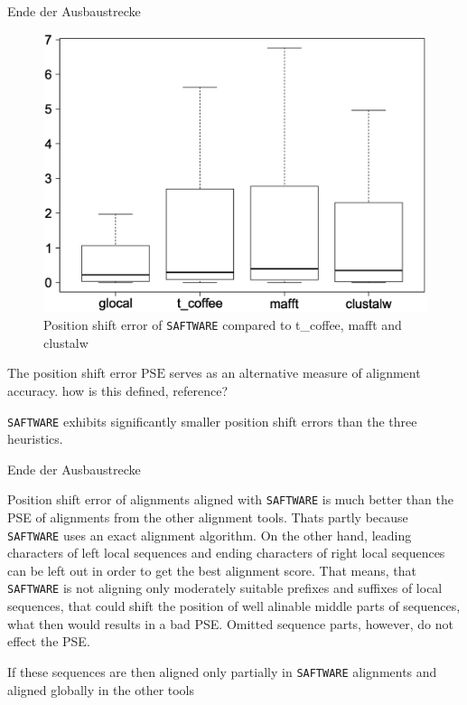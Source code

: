 \documentclass[a4paper,10pt]{article}
\newcommand{\TODO}[1]{\begingroup\color{red}#1\endgroup}
\newcommand{\NR}[1]{\begingroup\color{orange}#1\endgroup}
\newcommand{\SAFTWARE}{\TODO{\texttt{SAFTWARE}}}
\begin{document}
\TODO{Ende der Ausbaustrecke}

\begin{figure}
  \begin{center}
    \includegraphics[width=1\columnwidth]{pse_compued_correctly.eps}
  \end{center}
  \label{fig:pse}
  \caption{Position shift error of \SAFTWARE{} compared to t\_coffee, mafft
    and clustalw}
\end{figure}

The position shift error $\mbox{PSE}$ serves as an alternative measure
of alignment accuracy. \TODO{how is this defined, reference?}


\SAFTWARE{} exhibits significantly smaller position shift errors than the
three heuristics.

\TODO{Ende der Ausbaustrecke} 


\NR{Position shift error of alignments aligned with \SAFTWARE{} is much better than the PSE of alignments from the other alignment tools. Thats partly because \SAFTWARE{} uses an exact alignment algorithm. On the other hand, leading characters of left local sequences and ending characters of right local sequences can be left out in order to get the best alignment score. That means, that \SAFTWARE{} is not aligning only moderately suitable prefixes and suffixes of local sequences, that could shift the position of well alinable middle parts of sequences, what then would results in a bad PSE. Omitted sequence parts, however, do not effect the PSE.

If these sequences are then aligned only partially in \SAFTWARE{} alignments and aligned globally in the other tools
}
\end{document}
